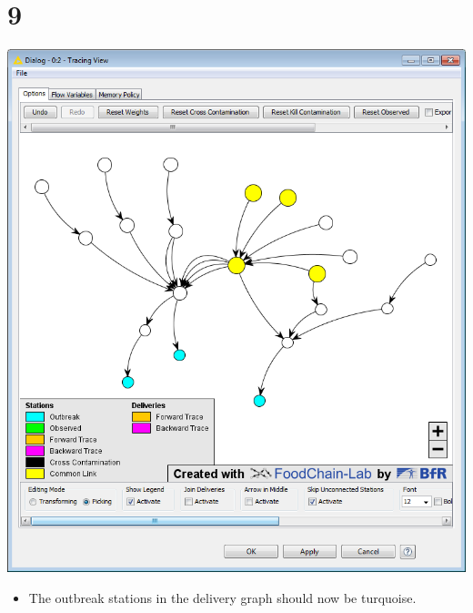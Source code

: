 \documentclass{beamer}
\begin{document}
\section{9}
\begin{frame}
	\begin{center}
  		\includegraphics[height=0.6\textheight]{9.png}
	\end{center}
	\begin{itemize}
		\item The outbreak stations in the delivery graph should now be turquoise.
	\end{itemize}
\end{frame}
\end{document}
